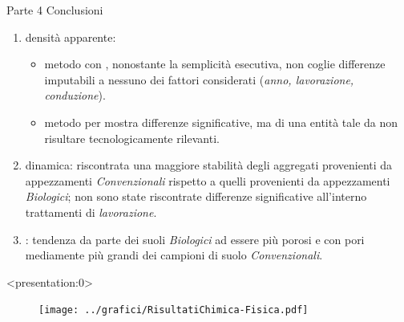 \documentclass[10pt]{beamer}
\begin{document}
\begin{frame}[label=finale]{Parte 4 \small{Conclusioni}}
  \begin{enumerate}[<+->]

  \item densità apparente:
    \begin{itemize}
    \item metodo con \hyperlink{Core}{}, nonostante la semplicità esecutiva,
      non coglie differenze imputabili a nessuno dei fattori considerati
      (\emph{anno, lavorazione, conduzione}).
    \item metodo per \hyperlink{Clod}{} mostra differenze significative, ma di
      una entità tale da non risultare tecnologicamente rilevanti.
    \end{itemize}
  \item \hyperlink{distribuzione}{} dinamica: riscontrata una
    maggiore stabilità degli aggregati provenienti da appezzamenti
    \emph{Convenzionali} rispetto a quelli provenienti da appezzamenti
    \emph{Biologici}; non sono state riscontrate differenze significative
    all'interno trattamenti di \emph{lavorazione}.
  \item \hyperlink{Porosimetria}{}: tendenza da parte dei suoli
    \emph{Biologici} ad essere più porosi e con pori mediamente più
    grandi dei campioni di suolo \emph{Convenzionali}.
  \end{enumerate}

\end{frame}




\begin{frame}
\end{frame}

\appendix

\begin{frame}<presentation:0>
  \vspace{1.5cm}
  \begin{figure}
    \centering
    \texttt{[image: ../grafici/RisultatiChimica-Fisica.pdf]}
  \end{figure}
\end{frame}
\end{document}
